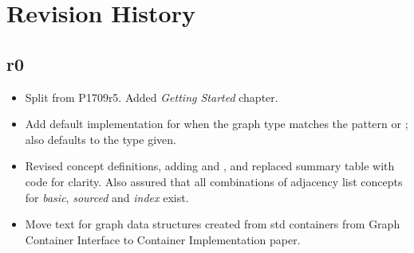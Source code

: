 \section{Revision History}

\subsection*{\paperno r0}

\begin{itemize}
      \item Split from P1709r5. Added \textit{Getting Started} chapter.
      \item Add default implementation for  when the graph type matches the 
            pattern  or ;
             also defaults to the  type given.
      \item Revised concept definitions, adding  and , and replaced
            summary table with code for clarity. Also assured that all combinations of adjacency list concepts for
            \textit{basic}, \textit{sourced} and \textit{index} exist.
      \item Move text for graph data structures created from std containers from Graph Container Interface to 
            Container Implementation paper.
\end{itemize}
